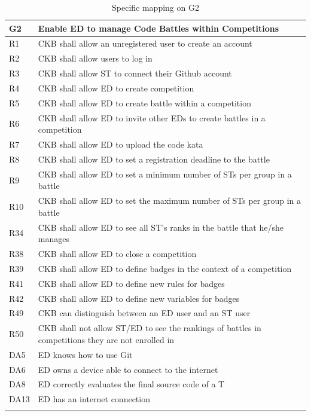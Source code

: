   \begin{longtable}{|l|p{12cm}| }
    \hline
    \textbf{G2} & \textbf{Enable ED to manage Code Battles within Competitions}      \\
    \hline
    R1 & CKB shall allow an unregistered user to create an account \\
    \hline
    R2 & CKB shall allow users to log in \\
    \hline
    R3 & CKB shall allow ST to connect their Github account \\
    \hline
    R4 & CKB shall allow ED to create competition \\
    \hline
    R5 & CKB shall allow ED to create battle within a competition \\
    \hline
    R6 & CKB shall allow ED to invite other EDs to create battles in a competition \\
    \hline
    R7 & CKB shall allow ED to upload the code kata \\
    \hline
    R8 & CKB shall allow ED to set a registration deadline to the battle \\
    \hline
    R9 & CKB shall allow ED to set a minimum number of STs per group in a battle \\
    \hline
    R10 & CKB shall allow ED to set the maximum number of STs per group in a battle \\
    \hline
    R34 & CKB shall allow ED to see all ST’s ranks in the battle that he/she manages \\
    \hline
    R38 & CKB shall allow ED to close a competition \\
    \hline
    R39 & CKB shall allow ED to define badges in the context of a competition \\
    \hline
    R41 & CKB shall allow ED to define new rules for badges \\
    \hline
    R42 & CKB shall allow ED to define new variables for badges \\
    \hline
    R49 & CKB can distinguish between an ED user and an ST user \\
    \hline
    R50 & CKB shall not allow ST/ED to see the rankings of battles in competitions they are not enrolled in \\
    \hline
    DA5 & ED knows how to use Git \\
    \hline
    DA6 & ED owns a device able to connect to the internet \\
    \hline
    DA8 & ED correctly evaluates the final source code of a T \\
    \hline
    DA13 & ED has an internet connection \\
    \hline

    \caption{Specific mapping on G2}
    \label{tab:mappingG2}
  \end{longtable}

